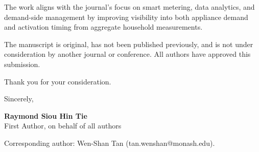 \documentclass[10pt]{article}
\begin{document}
The work aligns with the journal's focus on smart metering, data analytics, and demand-side management by improving visibility into both appliance demand and activation timing from aggregate household measurements.

The manuscript is original, has not been published previously, and is not under consideration by another journal or conference. All authors have approved this submission.

Thank you for your consideration.

Sincerely,

\vspace{1.5em}

\textbf{Raymond Siou Hin Tie}\\
First Author, on behalf of all authors

Corresponding author: Wen-Shan Tan (tan.wenshan@monash.edu).
\end{document}
